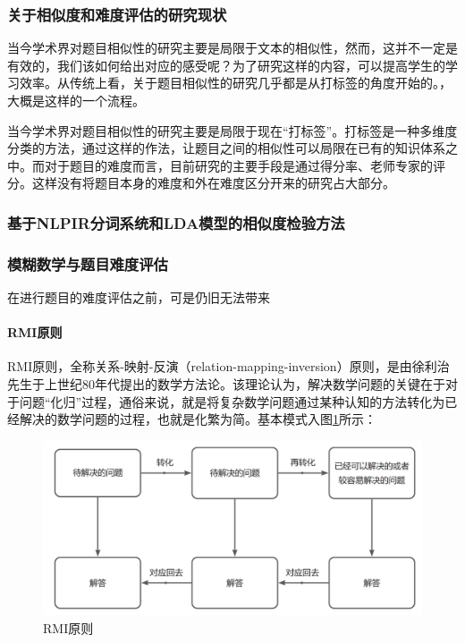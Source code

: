 \subsubsection{关于相似度和难度评估的研究现状}

当今学术界对题目相似性的研究主要是局限于文本的相似性，然而，这并不一定是有效的，我们该如何给出对应的感受呢？为了研究这样的内容，可以提高学生的学习效率。从传统上看，关于题目相似性的研究几乎都是从打标签的角度开始的。\cite{xuTimunandupinggufangfayanjiuzongshu2022}，大概是这样的一个流程。

当今学术界对题目相似性的研究主要是局限于现在“打标签”。打标签是一种多维度分类的方法，通过这样的作法，让题目之间的相似性可以局限在已有的知识体系之中。而对于题目的难度而言，目前研究的主要手段是通过得分率、老师专家的评分。这样没有将题目本身的难度和外在难度区分开来的研究占大部分。

\subsubsection{基于NLPIR分词系统和LDA模型的相似度检验方法}



\subsubsection{模糊数学与题目难度评估}

在进行题目的难度评估之前，可是仍旧无法带来

\paragraph{RMI原则}

RMI原则，全称关系-映射-反演（relation-mapping-inversion）原则，是由徐利治先生于上世纪80年代提出的数学方法论\cite{zhangShuxueshitishiqiannandudeyingxiangyinsujiqilianghuayanjiu2022}。该理论认为，解决数学问题的关键在于对于问题“化归”过程，通俗来说，就是将复杂数学问题通过某种认知的方法转化为已经解决的数学问题的过程，也就是化繁为简。基本模式入图\ref{figure040117}所示：

\begin{figure}[h]
    \centering
    \includegraphics[scale=0.3]{res/figure040117.png}
    \caption{RMI原则}
    \label{figure040117}
\end{figure}

